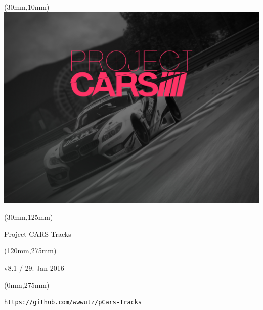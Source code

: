 \documentclass[oneside, a4paper, 12pt]{book}
\begin{document}
\selectfont
\textblockorigin{0cm}{0cm}

\newlength{\Logo}
\setlength{\Logo}{210mm-60mm}
\begin{textblock*}{\Logo}(30mm,10mm)%
\includegraphics[width=\Logo]{pcars-main.png}
\end{textblock*}

\begin{textblock*}{\Logo}(30mm,125mm)%
\begin{center}\Huge{Project CARS Tracks}\end{center}
\end{textblock*}

\begin{textblock*}{90mm}(120mm,275mm)%
\begin{center}\Huge{v8.1 / 29. Jan 2016}\end{center}
\end{textblock*}

\begin{textblock*}{90mm}(0mm,275mm)%
\begin{center}\tt{https://github.com/wwwutz/pCars-Tracks}\end{center}
\end{textblock*}


\null\newpage


\end{document}

